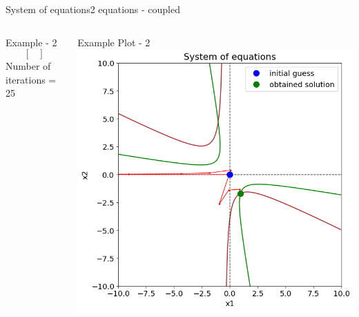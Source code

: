 \documentclass{beamer}
\begin{document}
\begin{frame}{System of equations}{2 equations - coupled}
\begin{columns}[t]
\begin{block}{\footnotesize Example - 2}
\[\begin{bmatrix}
                \end{bmatrix}
            \]
            Number of iterations = 25
        \end{block}
        \begin{block}{\footnotesize Example Plot - 2}
            \scriptsize
            \includegraphics[width=\textwidth]{Figures/syseqns_2.png}
        \end{block}
        \vfill
    \end{columns}
\end{frame}
\end{document}
